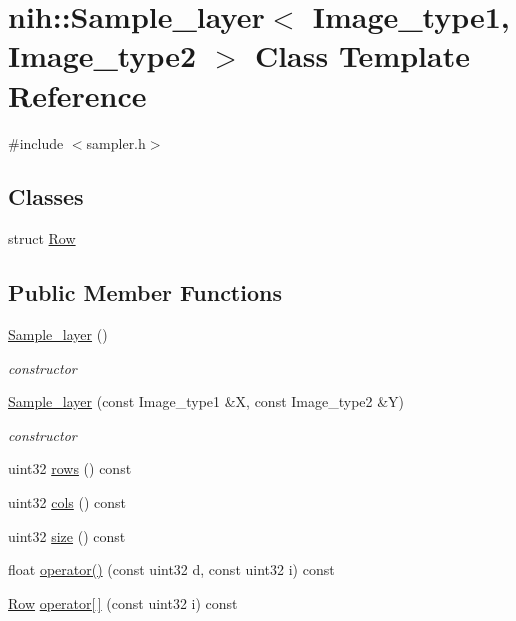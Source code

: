 \hypertarget{classnih_1_1_sample__layer}{
\section{nih\-:\-:\-Sample\-\_\-layer$<$ \-Image\-\_\-type1, \-Image\-\_\-type2 $>$ \-Class \-Template \-Reference}
\label{classnih_1_1_sample__layer}
}


{\ttfamily \#include $<$sampler.\-h$>$}

\subsection*{\-Classes}
\begin{DoxyCompactItemize}
\item 
struct \hyperlink{structnih_1_1_sample__layer_1_1_row}{\-Row}
\end{DoxyCompactItemize}
\subsection*{\-Public \-Member \-Functions}
\begin{DoxyCompactItemize}
\item 
\hypertarget{classnih_1_1_sample__layer_a124dbfce20926ed15b090bbb72ee1013}{
\hyperlink{classnih_1_1_sample__layer_a124dbfce20926ed15b090bbb72ee1013}{\-Sample\-\_\-layer} ()}
\label{classnih_1_1_sample__layer_a124dbfce20926ed15b090bbb72ee1013}

\begin{DoxyCompactList}\small\item\em constructor \end{DoxyCompactList}\item 
\hypertarget{classnih_1_1_sample__layer_a46ae62ad1e481e929fdf00584fd4bc77}{
\hyperlink{classnih_1_1_sample__layer_a46ae62ad1e481e929fdf00584fd4bc77}{\-Sample\-\_\-layer} (const \-Image\-\_\-type1 \&\-X, const \-Image\-\_\-type2 \&\-Y)}
\label{classnih_1_1_sample__layer_a46ae62ad1e481e929fdf00584fd4bc77}

\begin{DoxyCompactList}\small\item\em constructor \end{DoxyCompactList}\item 
uint32 \hyperlink{classnih_1_1_sample__layer_ad7845baacb43dfa554ebe376fafdcdf6}{rows} () const 
\item 
uint32 \hyperlink{classnih_1_1_sample__layer_a6b936d7e4f23aedce39b7e647cce555f}{cols} () const 
\item 
uint32 \hyperlink{classnih_1_1_sample__layer_a86e7d9f4bda99fece5985a5d45368060}{size} () const 
\item 
float \hyperlink{classnih_1_1_sample__layer_ae69a60903be4c8215bc266e3d8c24a3e}{operator()} (const uint32 d, const uint32 i) const 
\item 
\hyperlink{structnih_1_1_sample__layer_1_1_row}{\-Row} \hyperlink{classnih_1_1_sample__layer_a5e4e5f18b56cb17fcc49f18983a016b0}{operator\mbox{[}$\,$\mbox{]}} (const uint32 i) const 
\end{DoxyCompactItemize}


